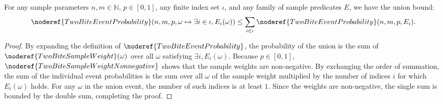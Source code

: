 \begin{helper}
For any sample parameters \(n, m\in\mathbb N\), \(p\in[0,1]\), any finite index set \(\iota\), and any family of sample predicates \(E\), we have the union bound:
\[
\noderef{TwoBiteEventProbability}(n, m, p, \omega \mapsto \exists i\in\iota, E_i(\omega)) \le \sum_{i \in \iota} \noderef{TwoBiteEventProbability}(n, m, p, E_i).
\]
\end{helper}
\begin{proof}
By expanding the definition of \(\noderef{TwoBiteEventProbability}\), the probability of the union is the sum of \(\noderef{TwoBiteSampleWeight}(\omega)\) over all \(\omega\) satisfying \(\exists i, E_i(\omega)\).
Because \(p \in [0, 1]\), \(\noderef{TwoBiteSampleWeightNonnegative}\) shows that the sample weights are non-negative.
By exchanging the order of summation, the sum of the individual event probabilities is the sum over all \(\omega\) of the sample weight multiplied by the number of indices \(i\) for which \(E_i(\omega)\) holds.
For any \(\omega\) in the union event, the number of such indices is at least \(1\). Since the weights are non-negative, the single sum is bounded by the double sum, completing the proof.
\end{proof}
